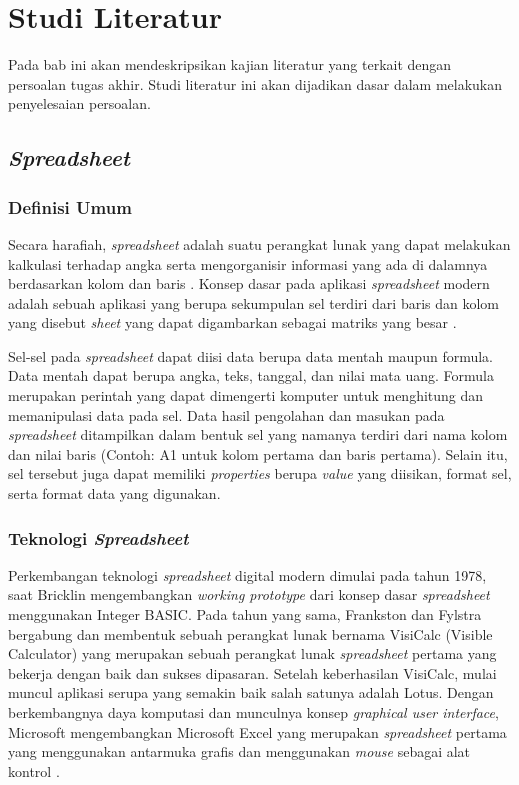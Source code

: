 \chapter{Studi Literatur}

Pada bab ini akan mendeskripsikan kajian literatur yang terkait dengan persoalan tugas akhir. Studi literatur ini akan dijadikan dasar dalam melakukan penyelesaian persoalan.

\section{\textit{Spreadsheet}}
\subsection{Definisi Umum}
Secara harafiah, \textit{spreadsheet} adalah suatu perangkat lunak yang dapat melakukan kalkulasi terhadap angka serta mengorganisir informasi yang ada di dalamnya berdasarkan kolom dan baris \parencite{meriamwebster-spreadsheet}. Konsep dasar pada aplikasi \textit{spreadsheet} modern adalah sebuah aplikasi yang berupa sekumpulan sel terdiri dari baris dan kolom yang disebut \textit{sheet} yang dapat digambarkan sebagai matriks yang besar \parencite{Ronen1989}.

Sel-sel pada \textit{spreadsheet} dapat diisi data berupa data mentah maupun formula. Data mentah dapat berupa angka, teks, tanggal, dan nilai mata uang. Formula merupakan perintah yang dapat dimengerti komputer untuk menghitung dan memanipulasi data pada sel. Data hasil pengolahan dan masukan pada \textit{spreadsheet} ditampilkan dalam bentuk sel yang namanya terdiri dari nama kolom dan nilai baris (Contoh: A1 untuk kolom pertama dan baris pertama). Selain itu, sel tersebut juga dapat memiliki \textit{properties} berupa \textit{value} yang diisikan, format sel, serta format data yang digunakan.

\subsection{Teknologi \textit{Spreadsheet}}
Perkembangan teknologi \textit{spreadsheet} digital modern dimulai pada tahun 1978, saat Bricklin mengembangkan \textit{working prototype} dari konsep dasar \textit{spreadsheet} menggunakan Integer BASIC. Pada tahun yang sama, Frankston dan Fylstra bergabung dan membentuk sebuah perangkat lunak bernama VisiCalc (Visible Calculator) yang merupakan sebuah perangkat lunak \textit{spreadsheet} pertama yang bekerja dengan baik dan sukses dipasaran. Setelah keberhasilan VisiCalc, mulai muncul aplikasi serupa yang semakin baik salah satunya adalah Lotus. Dengan berkembangnya daya komputasi dan munculnya konsep \textit{graphical user interface}, Microsoft mengembangkan Microsoft Excel yang merupakan \textit{spreadsheet} pertama yang menggunakan antarmuka grafis dan menggunakan \textit{mouse} sebagai alat kontrol \parencite{power2004brief}.

